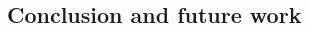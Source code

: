 \documentclass[12pt, a4paper, oneside]{book}
\begin{document}
\begin{spacing}{1.5}
		\chapter{Conclusion and future work}
		\label{chap:Conclusion}
		
		
		\begin{singlespace}
		\clearpage
		\renewcommand{\bibname}{References}
		
		\clearpage
		\end{singlespace}
		\backmatter
	\end{spacing}
\end{document}
